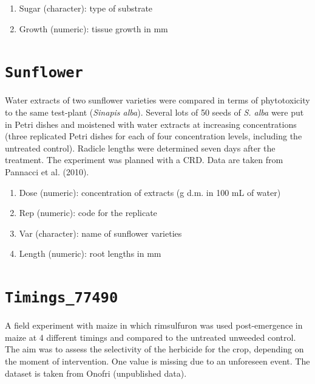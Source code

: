 \documentclass[
  letterpaper,
  DIV=11,
  numbers=noendperiod]{scrreprt}
\providecommand{\tightlist}{%
  \setlength{\itemsep}{0pt}\setlength{\parskip}{0pt}}
\begin{document}
\begin{enumerate}
\def\labelenumi{\arabic{enumi}.}
\tightlist
\item
  Sugar (character): type of substrate
\item
  Growth (numeric): tissue growth in mm
\end{enumerate}

\section*{\texorpdfstring{\texttt{Sunflower}}{Sunflower}}\label{Sunflower}


Water extracts of two sunflower varieties were compared in terms of
phytotoxicity to the same test-plant (\emph{Sinapis alba}). Several lots
of 50 seeds of \emph{S. alba} were put in Petri dishes and moistened
with water extracts at increasing concentrations (three replicated Petri
dishes for each of four concentration levels, including the untreated
control). Radicle lengths were determined seven days after the
treatment. The experiment was planned with a CRD. Data are taken from
Pannacci et al. (2010).

\begin{enumerate}
\def\labelenumi{\arabic{enumi}.}
\tightlist
\item
  Dose (numeric): concentration of extracts (g d.m. in 100 mL of water)
\item
  Rep (numeric): code for the replicate
\item
  Var (character): name of sunflower varieties
\item
  Length (numeric): root lengths in mm
\end{enumerate}

\section*{\texorpdfstring{\texttt{Timings\_77490}}{Timings\_77490}}\label{timings_77490}


A field experiment with maize in which rimsulfuron was used
post-emergence in maize at 4 different timings and compared to the
untreated unweeded control. The aim was to assess the selectivity of the
herbicide for the crop, depending on the moment of intervention. One
value is missing due to an unforeseen event. The dataset is taken from
Onofri (unpublished data).
\end{document}
